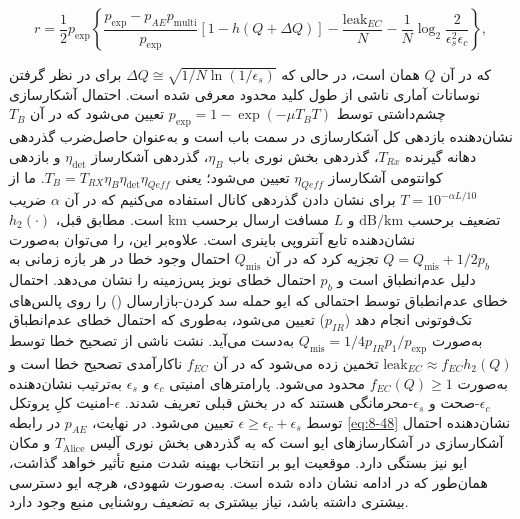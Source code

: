 \begin{equation}
	r = \frac{1}{2} p_{\exp} \left\{ \frac{p_{\exp} - p_{AE} p_{\text{multi}}}{p_{\exp}} [1 - h(Q + \Delta Q)] - \frac{\text{leak}_{EC}}{N} - \frac{1}{N} \log_2 \frac{2}{\epsilon_s^2 \epsilon_c} \right\},
	\label{eq:8-48}
\end{equation}

که در آن $Q$ همان  است، در حالی که $\Delta Q \cong \sqrt{1/N \ln(1/\epsilon_s)}$ برای در نظر گرفتن نوسانات آماری ناشی از طول کلید محدود معرفی شده است. احتمال آشکارسازی چشم‌داشتی توسط $p_{\exp} = 1 - \exp(-\mu T_B T)$ تعیین می‌شود که در آن $T_B$ نشان‌دهنده بازدهی کل آشکارسازی در سمت باب است و به‌عنوان حاصل‌ضرب گذردهی دهانه گیرنده $T_{Rx}$، گذردهی بخش نوری باب $\eta_B$، گذردهی آشکارساز $\eta_{\text{det}}$ و بازدهی کوانتومی آشکارساز $\eta_{Qeff}$ تعیین می‌شود؛ یعنی $T_B = T_{RX} \eta_B \eta_{\text{det}} \eta_{Qeff}$. ما از $T = 10^{-\alpha L / 10}$ برای نشان دادن گذردهی کانال استفاده می‌کنیم که در آن $\alpha$ ضریب تضعیف برحسب $\text{dB/km}$ و $L$ مسافت ارسال برحسب $\text{km}$ است. مطابق قبل، $h_2(\cdot)$ نشان‌دهنده تابع آنتروپی باینری است. علاوه‌بر این،  را می‌توان به‌صورت $Q = Q_{\text{mis}} + 1/2 p_b$ تجزیه کرد که در آن $Q_{\text{mis}}$ احتمال وجود خطا در هر بازه زمانی به دلیل عدم‌انطباق است و $p_b$ احتمال خطای نویز پس‌زمینه را نشان می‌دهد. احتمال خطای عدم‌انطباق توسط احتمالی که ایو حمله سد کردن-بازارسال () را روی پالس‌های تک‌فوتونی انجام دهد ($p_{IR}$) تعیین می‌شود، به‌طوری که احتمال خطای عدم‌انطباق به‌صورت $Q_{\text{mis}} = 1/4 p_{IR} p_1 / p_{\exp}$ به‌دست می‌آید. نشت ناشی از تصحیح خطا توسط $\text{leak}_{EC} \approx f_{EC} h_2(Q)$ تخمین زده می‌شود که در آن $f_{EC}$ ناکارآمدی تصحیح خطا است و به‌صورت $f_{EC}(Q) \geq 1$ محدود می‌شود. پارامترهای امنیتی $\epsilon_c$ و $\epsilon_s$ به‌ترتیب نشان‌دهنده $\epsilon_c$-صحت و $\epsilon_s$-محرمانگی هستند که در بخش قبلی تعریف شدند. $\epsilon$-امنیت کلِ پروتکل توسط $\epsilon \geq \epsilon_c + \epsilon_s$ تعیین می‌شود. در نهایت، $p_{AE}$ در رابطه \eqref{eq:8-48} نشان‌دهنده احتمال آشکارسازی در آشکارسازهای ایو است که به گذردهی بخش نوری آلیس $T_{\text{Alice}}$ و مکان ایو نیز بستگی دارد. موقعیت ایو بر انتخاب بهینه شدت منبع تأثیر خواهد گذاشت، همان‌طور که در ادامه نشان داده شده است. به‌صورت شهودی، هرچه ایو دسترسی بیشتری داشته باشد، نیاز بیشتری به تضعیف روشنایی منبع وجود دارد.

